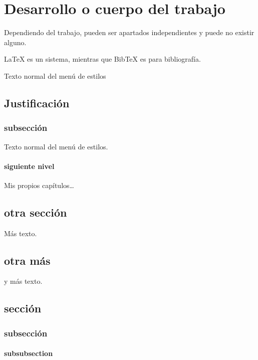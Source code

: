 \chapter{Desarrollo o cuerpo del trabajo}

Dependiendo del trabajo, pueden ser apartados independientes y puede no existir alguno.

LaTeX es un sistema, mientras que BibTeX es para bibliografía.


Texto normal del menú de estilos

\section{Justificación}
\subsection{subsección}

Texto normal del menú de estilos.

\subsubsection{siguiente nivel}

Mis propios capítulos\dots

\section{otra sección}

Más texto.

\section{otra más}

y más texto.


\section{sección}
\subsection{subsección}
\subsubsection{subsubsection}